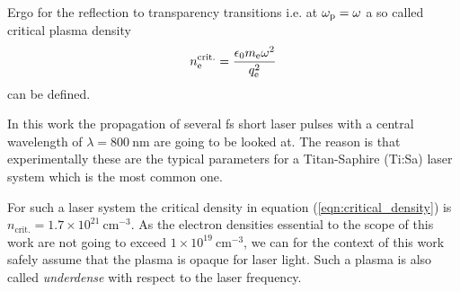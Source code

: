 Ergo for the reflection to transparency transitions  i.e. at $\omega_\mathrm{p} = \omega$ a so called critical plasma density
\begin{equation}
\label{eqn:critical_density}
n_\mathrm{e}^\mathrm{crit.}=\frac{\epsilon_0 m_\mathrm{e} \omega^2}{q_\mathrm{e}^2}
\end{equation}
can be defined.

In this work the propagation of several fs short laser pulses with a central wavelength of $\lambda = 800\ \mathrm{nm}$ are going to be looked at. The reason is that experimentally these are the typical parameters for a Titan-Saphire (Ti:Sa) laser system which is  the most common one. 

For such a laser system the critical density in equation (\ref{eqn:critical_density}) is $n_\mathrm{crit.}=1.7\times 10^{21}\ \mathrm{cm}^{-3}$.
As the electron densities essential to the scope of this work are not going to exceed $1\times 10^{19}\ \mathrm{cm}^{-3}$, we can for the context of this work safely assume that the plasma is opaque for laser light. Such a plasma is also called \textit{underdense} with respect to the laser frequency.
%
%
%
%





